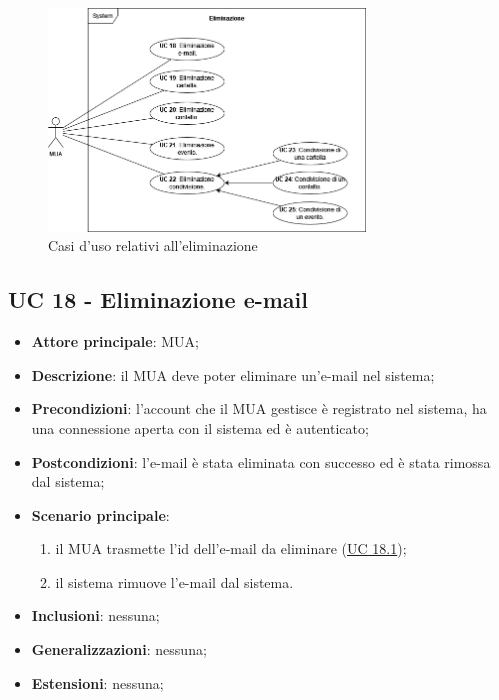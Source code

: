
\begin{figure}[H]
    \includegraphics[width=0.75\textwidth]{sections/uc_imgs/UC-eliminazione.png}
    \centering
    \caption{Casi d'uso relativi all'eliminazione}
\end{figure}

\subsection{UC 18 - Eliminazione e-mail} \label{sec:UC18}

    \begin{itemize}
        \item \textbf{Attore principale}: MUA;
        \item \textbf{Descrizione}: il MUA deve poter eliminare un'e-mail nel sistema;
        \item \textbf{Precondizioni}: l’account che il MUA gestisce è registrato nel sistema, ha una connessione aperta con il sistema ed è autenticato;
        \item \textbf{Postcondizioni}: l'e-mail è stata eliminata con successo ed è stata rimossa dal sistema;
        \item \textbf{Scenario principale}:
            \begin{enumerate}
                \item il MUA trasmette l'id dell'e-mail da eliminare (\hyperref[sec:UC18.1]{UC 18.1});
                \item il sistema rimuove l'e-mail dal sistema.
            \end{enumerate}
        \item \textbf{Inclusioni}: nessuna;
        \item \textbf{Generalizzazioni}: nessuna;
        \item \textbf{Estensioni}: nessuna;
    \end{itemize}

